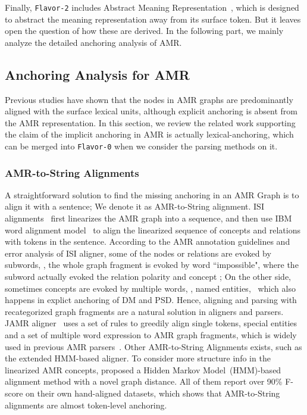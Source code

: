 Finally, \texttt{Flavor-2} includes Abstract Meaning
Representation~\cite[AMR,][]{Banarescu:LWPjKI7N}, which is designed to
abstract the meaning representation away from its surface token. But
it leaves open the question of how these are derived. In the following
part, we mainly analyze the detailed anchoring analysis of AMR.

\subsection{Anchoring Analysis for AMR}
\label{ssec:lex-phr:amr-anchor}
Previous studies have shown that the nodes in AMR graphs are
predominantly aligned with the surface lexical units, although
explicit anchoring is absent from the AMR representation.  In this
section, we review the related work supporting the claim of the
implicit anchoring in AMR is actually lexical-anchoring, which can be
merged into \texttt{Flavor-0} when we consider the parsing methods on
it.

\subsubsection{AMR-to-String Alignments}
\label{sssec:lex-phr:amr-to-string}
A straightforward solution to find the missing anchoring in an AMR
Graph is to align it with a sentence; We denote it as AMR-to-String
alignment. ISI alignments~\cite{Pourdamghani:2014aligning} first
linearizes the AMR graph into a sequence, and then use IBM word
alignment model~\cite{brown1993mathematics} to align the linearized
sequence of concepts and relations with tokens in the
sentence. According to the AMR annotation guidelines and error
analysis of ISI aligner, some of the nodes or relations are evoked by
subwords, \eg, the whole graph fragment  is evoked by word ``impossible", where the subword
 actually evoked the relation polarity and concept
\tquoted{-}; On the other side, sometimes concepts are evoked by
multiple words, \eg, named entities, ~which also happens in explict anchoring
of DM and PSD. Hence, aligning and parsing with recategorized graph
fragments are a natural solution in aligners and parsers. JAMR
aligner~\cite{Flanigan:2014vc} uses a set of rules to greedily align
single tokens, special entities and a set of multiple word expression
to AMR graph fragments, which is widely used in previous AMR
parsers~\cite[\eg][]{Flanigan:2014vc,Wang:2015uo,Artzi:2009tb,Pust:2015ug,Peng:2015tj,Konstas:2017uj,Wang:2017vt}. Other
AMR-to-String Alignments exists, such as the extended HMM-based
aligner. To consider more structure info in the linearized AMR
concepts, \citet{Wang:2017vt} proposed a Hidden Markov
Model~(HMM)-based alignment method with a novel graph distance. All of
them report over 90\% F-score on their own hand-aligned datasets,
which shows that AMR-to-String alignments are almost token-level
anchoring.

